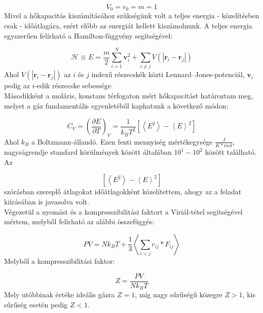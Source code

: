\begin{multicols}{2}
\begin{equation}
    V_{0} = r_{0} = m = 1
\end{equation}
Mivel a hőkapacitás kiszámításához szükségünk volt a teljes energia - közelítésben csak - időátlagára, ezért előbb az energiát kellett kiszámolnunk. A teljes energia egyszerűen felírható a Hamilton-függvény segítségével:

\begin{equation}
    \mathscr{H}
    \equiv
    E
    =
    \frac{m}{2} \sum_{i = 1}^{N} \boldsymbol{v}_{i}^{2}
    +
    \sum_{i \neq j} V \left( \left| \boldsymbol{r}_{i} - \boldsymbol{r}_{j} \right| \right)
\end{equation}
Ahol $V \left( \left| \boldsymbol{r}_{i} - \boldsymbol{r}_{j} \right| \right)$ az $i$ és $j$ indexű részecskék közti Lennard--Jones-potenciál, $\boldsymbol{v}_{i}$ pedig az $i$-edik részecske sebessége. \\
Másodikként a moláris, konstans térfogaton mért hőkapacitást határoztam meg, melyet a gáz fundamentális egyenletéből kaphatunk a következő módon:

\begin{equation}
    C_{V}
    =
    \left( \frac{\partial E}{\partial T} \right)_{V}
    =
    \frac{1}{k_{B} T^{2}} \left[ \left< E^{2} \right> - \left< E \right>^{2} \right]
\end{equation}
Ahol $k_{B}$ a Boltzmann-állandó. Ezen fenti mennyiség mértékegysége $\frac{J}{K * mol}$, nagyságrendje standard körülmények között általában $10^{1} - 10^{2}$ között található\cite{thornton2012modern}. Az

\begin{equation}
    \left[ \left< E^{2} \right> - \left< E \right>^{2} \right]
\end{equation}
szórásban szereplő átlagokat időátlagokként közelítettem, ahogy az a feladat kiírásában is javasolva volt\cite{szamszim}. \\
Végezetül a nyomást és a kompresszibilitási faktort a Viriál-tétel segítségével mértem, melyből felírható az alábbi összefüggés:

\begin{equation}
    PV
    =
    N k_{B} T
    +
    \frac{1}{3} \left< \sum_{i < j} r_{ij} * F_{ij} \right>
\end{equation}
Melyből a kompresszibilitási faktor:

\begin{equation}
    Z = \frac{PV}{N k_{B} T}
\end{equation}
Mely utóbbinak értéke ideális gázra $Z = 1$, míg nagy sűrűségű közegre $Z > 1$, kis sűrűség esetén pedig $Z < 1$.


\end{multicols}
